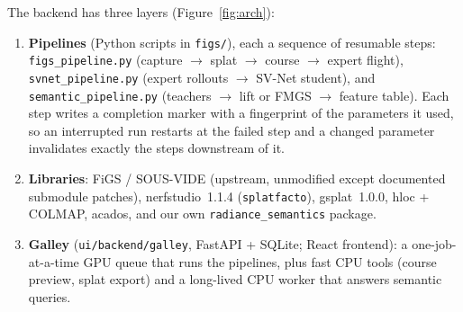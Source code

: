 \documentclass[11pt,a4paper]{article}
\newcommand{\code}[1]{\texttt{#1}}
\begin{document}
The backend has three layers (Figure~\ref{fig:arch}):
\begin{enumerate}
  \item \textbf{Pipelines} (Python scripts in \code{figs/}), each a sequence of resumable steps:
        \code{figs\_pipeline.py} (capture $\rightarrow$ splat $\rightarrow$ course $\rightarrow$ expert
        flight), \code{svnet\_pipeline.py} (expert rollouts $\rightarrow$ SV-Net student), and
        \code{semantic\_pipeline.py} (teachers $\rightarrow$ lift or FMGS $\rightarrow$ feature table).
        Each step writes a completion marker with a fingerprint of the parameters it used, so an
        interrupted run restarts at the failed step and a changed parameter invalidates exactly the
        steps downstream of it.
  \item \textbf{Libraries}: FiGS / SOUS-VIDE (upstream, unmodified except documented submodule
        patches), nerfstudio~1.1.4 (\code{splatfacto}), gsplat~1.0.0, hloc + COLMAP, acados, and our
        own \code{radiance\_semantics} package.
  \item \textbf{Galley} (\code{ui/backend/galley}, FastAPI + SQLite; React frontend): a one-job-at-a-time
        GPU queue that runs the pipelines, plus fast CPU tools (course preview, splat export) and a
        long-lived CPU worker that answers semantic queries.
\end{enumerate}
\end{document}
